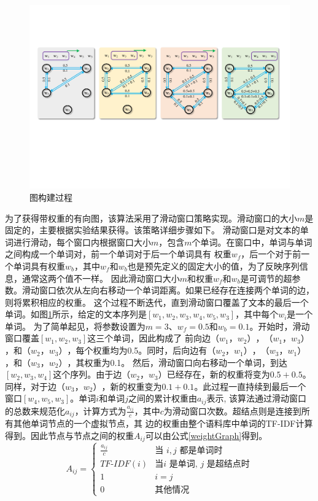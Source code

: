 \begin{figure}[htb]
    \setlength{\belowcaptionskip}{0pt}
    \centering
    \includegraphics[width=1\textwidth]{pic/text2graph.pdf}
    \caption{图构建过程}
    \label{text2graph}
\end{figure}

为了获得带权重的有向图，该算法采用了滑动窗口策略实现。滑动窗口的大小$m$是固定的，主要根据实验结果获得。该策略详细步骤如下。
滑动窗口是对文本的单词进行滑动，每个窗口内根据窗口大小$m$，包含$m$个单词。在窗口中，单词与单词之间构成一个单词对，前一个单词对于后一个单词具有
权重$w_f$，后一个对于前一个单词具有权重$w_b$，其中$w_f$和$w_b$也是预先定义的固定大小的值，为了反映序列信息，通常这两个值不一样。
因此滑动窗口大小$m$和权重$w_f$和$w_b$是可调节的超参数。滑动窗口依次从左向右移动一个单词距离。如果已经存在连接两个单词的边，则将累积相应的权重。
这个过程不断迭代，直到滑动窗口覆盖了文本的最后一个单词。如图\ref{text2graph}所示，给定的文本序列是$[w_1,w_2,w_3,w_4,w_5,w_3]$，其中每个$w_i$是一个单词。
为了简单起见，将参数设置为$m=3$、$w_f=0.5$和$w_b=0.1$。开始时，滑动窗口覆盖$[w_1,w_2,w_3]$这三个单词，因此构成了
前向边$（w_1，w_2）$，$（w_1，w_3）$，和$（w_2，w_3）$，每个权重均为0.5。同时，后向边有$（w_2，w_1）$，$（w_3，w_1）$，和$（w_3，w_2）$，其权重为0.1。
然后，滑动窗口向右移动一个单词，到达$[w_2,w_3,w_4]$这个序列。由于边$（w_2，w_3）$已经存在，新的权重将变为$0.5+0.5$。
同样，对于边$（w_3，w_2）$，新的权重变为$0.1+0.1$。此过程一直持续到最后一个窗口$[w_4,w_5,w_3]$。单词$i$和单词$j$之间的累计权重由$a_{ij}$表示,
该算法通过滑动窗口的总数来规范化$a_{ij}$，计算方式为$\frac{a_{ij}}{c}$，其中$c$为滑动窗口次数。超结点则是连接到所有其他单词节点的一个虚拟节点，其
边的权重由整个语料库中单词的TF-IDF计算得到。因此节点与节点之间的权重$A_{ij}$可以由公式\ref{weightGraph}得到。
\begin{equation}\label{weightGraph}
A_{ij}=
\begin{cases}
\frac{a_{ij}}{c}& \text{当 $i, j$ 都是单词时}\\
TF\text{-}IDF(i) & \text{当$i$ 是单词, $j$ 是超结点时}\\
1 & \text{$i=j$}\\
0 & \text{其他情况}
\end{cases}
\end{equation}

